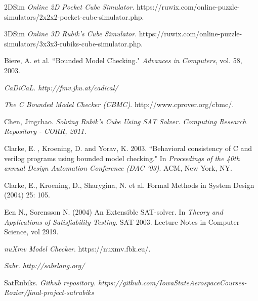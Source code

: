 \documentclass{article}
\begin{document}
\begin{thebibliography}{9}

\item{2DSim}
\textit{Online 2D Pocket Cube Simulator}. https://ruwix.com/online-puzzle-simulators/2x2x2-pocket-cube-simulator.php.

\item{3DSim}
\textit{Online 3D Rubik's Cube Simulator}. https://ruwix.com/online-puzzle-simulators/3x3x3-rubiks-cube-simulator.php.

 Biere, A. et al. ``Bounded Model Checking." \textit{Advances in Computers}, vol. 58, 2003.

\textit{{CaDiCaL}. 
http://fmv.jku.at/cadical/}

 \textit{The C Bounded Model Checker (CBMC)}. http://www.cprover.org/cbmc/.

Chen, Jingchao. 
\textit{{Solving Rubik's Cube Using SAT Solver}. 
Computing Research Repository - CORR, 2011.}

 Clarke, E. , Kroening, D. and Yorav, K. 2003. ``Behavioral consistency of C and verilog programs using bounded model checking." In \textit{Proceedings of the 40th annual Design Automation Conference (DAC '03)}. ACM, New York, NY.

 Clarke, E., Kroening, D., Sharygina, N. et al. Formal Methods in System Design (2004) 25: 105. 

 Een N., Sorensson N. (2004) An Extensible SAT-solver. In \textit{Theory and Applications of Satisfiability Testing}. SAT 2003. Lecture Notes in Computer Science, vol 2919.

\textit{nuXmv Model Checker}. https://nuxmv.fbk.eu/. 

\textit{{Sabr}. 
http://sabrlang.org/}

SatRubiks.
\textit{{Github repository}.
https://github.com/IowaStateAerospaceCourses-Rozier/final-project-satrubiks}
\end{thebibliography}
\end{document}

